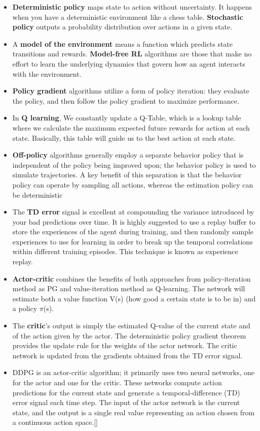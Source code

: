\documentclass[a4paper]{article}
\begin{document}
\begin{itemize}
    \item {\bf Deterministic policy} maps state to action without uncertainty. It happens when you have a deterministic environment like a chess table. {\bf Stochastic policy} outputs a probability distribution over actions in a given state. 
    \item A {\bf model of the environment} means a function which predicts state transitions and rewards. {\bf Model-free RL} algorithms are those that make no effort to learn the underlying dynamics that govern how an agent interacts with the environment.
    \item {\bf Policy gradient} algorithms utilize a form of policy iteration: they evaluate the policy, and then follow the policy gradient to maximize performance.   
    \item In {\bf Q learning}, We constantly update a Q-Table, which is a lookup table where we calculate the maximum expected future rewards for action at each state. Basically, this table will guide us to the best action at each state.
    \item {\bf Off-policy} algorithms generally employ a separate behavior policy that is independent of the policy being improved upon; the behavior policy is used to simulate trajectories. A key benefit of this separation is that the behavior policy can operate by sampling all actions, whereas the estimation policy can be deterministic
    \item The {\bf TD error} signal is excellent at compounding the variance introduced by your bad predictions over time. It is highly suggested to use a replay buffer to store the experiences of the agent during training, and then randomly sample experiences to use for learning in order to break up the temporal correlations within different training episodes. This technique is known as experience replay.
    \item {\bf Actor-critic} combines the benefits of both approaches from policy-iteration method as PG and value-iteration method as Q-learning. The network will estimate both a value function V(s) (how good a certain state is to be in) and a policy $\pi$(s).
    \item The {\bf critic}’s output is simply the estimated Q-value of the current state and of the action given by the actor. The deterministic policy gradient theorem provides the update rule for the weights of the actor network. The critic network is updated from the gradients obtained from the TD error signal.
    \item DDPG is an actor-critic algorithm; it primarily uses two neural networks, one for the actor and one for the critic. These networks compute action predictions for the current state and generate a temporal-difference (TD) error signal each time step. The input of the actor network is the current state, and the output is a single real value representing an action chosen from a continuous action space.[\cite{ddpgTutorial:2019}]
\end{itemize}
\end{document}
